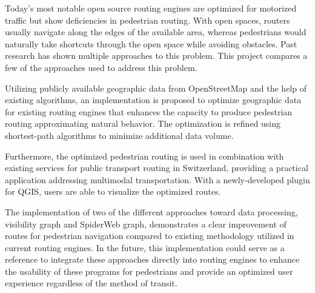 Today's most notable open source routing engines are optimized for motorized traffic but show deficiencies in pedestrian routing. With open spaces, routers usually navigate along the edges of the available area, whereas pedestrians would naturally take shortcuts through the open space while avoiding obstacles.
Past research has shown multiple approaches to this problem. This project compares a few of the approaches used to address this problem.

Utilizing publicly available geographic data from OpenStreetMap and the help of existing algorithms, an implementation is proposed to optimize geographic data for existing routing engines that enhances the capacity to produce pedestrian routing approximating natural behavior. The optimization is refined using shortest-path algorithms to minimize additional data volume.

Furthermore, the optimized pedestrian routing is used in combination with existing services for public transport routing in Switzerland, providing a practical application addressing multimodal transportation. With a newly-developed plugin for QGIS, users are able to visualize the optimized routes.

The implementation of two of the different approaches toward data processing, visibility graph and SpiderWeb graph, demonstrates a clear improvement of routes for pedestrian navigation compared to existing methodology utilized in current routing engines. In the future, this implementation could serve as a reference to integrate these approaches directly into routing engines to enhance the usability of these programs for pedestrians and provide an optimized user experience regardless of the method of transit.